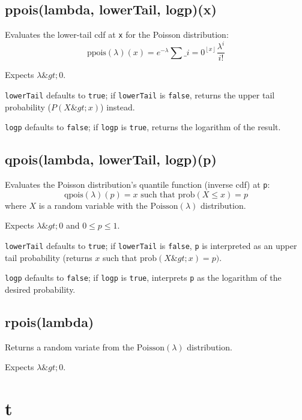 \documentclass{article}
\begin{document}
    \subsection*{ppois(lambda, lowerTail, logp)(x)}
    Evaluates the lower-tail cdf at \texttt{x} for the Poisson distribution:
$$\textrm{ppois}(\lambda)(x) = e^{-\lambda} \sum\_{i=0}^{\left \lfloor{x}\right \rfloor}\frac{\lambda^i}{i!}$$


Expects $\lambda \&gt; 0$.


\texttt{lowerTail} defaults to \texttt{true}; if \texttt{lowerTail} is \texttt{false}, returns
the upper tail probability ($P(X \&gt; x)$) instead.


\texttt{logp} defaults to \texttt{false}; if \texttt{logp} is \texttt{true}, returns the logarithm
of the result.


    \subsection*{qpois(lambda, lowerTail, logp)(p)}
    Evaluates the Poisson distribution's quantile function
(inverse cdf) at \texttt{p}:
$$\textrm{qpois}(\lambda)(p) = x \textrm{ such that } \textrm{prob}(X \leq x) = p$$
where $X$ is a random variable with the $\textrm{Poisson}(\lambda)$ distribution.


Expects $\lambda \&gt; 0$ and $0 \leq p \leq 1$.


\texttt{lowerTail} defaults to \texttt{true}; if \texttt{lowerTail} is \texttt{false}, \texttt{p} is
interpreted as an upper tail probability (returns
$x$ such that $\textrm{prob}(X \&gt; x) = p)$.


\texttt{logp} defaults to \texttt{false}; if \texttt{logp} is \texttt{true}, interprets \texttt{p} as
the logarithm of the desired probability.


    \subsection*{rpois(lambda)}
    Returns a random variate from the $\textrm{Poisson}(\lambda)$ distribution.


Expects $\lambda \&gt; 0$.


  \section{t}
\end{document}
